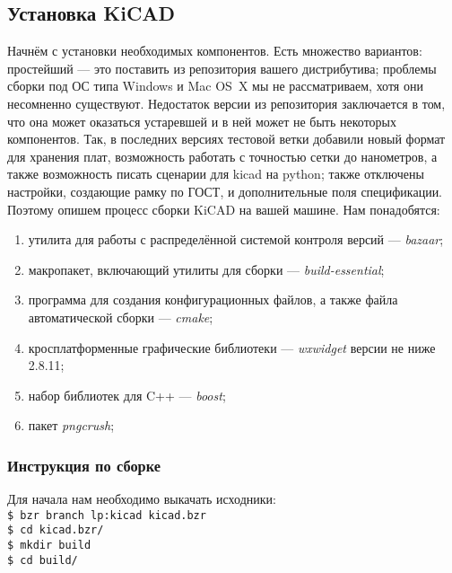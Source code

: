 \subsection{Установка KiCAD} 
Начнём с установки необходимых компонентов. Есть множество вариантов: простейший --- это поставить из репозитория вашего дистрибутива; проблемы сборки под ОС типа Windows и Mac OS~X  мы не рассматриваем, хотя они несомненно существуют. Недостаток версии из репозитория заключается в том, что она может оказаться устаревшей и в ней может не быть некоторых компонентов.
Так, в последних версиях тестовой ветки добавили новый формат для хранения плат, возможность работать с точностью сетки до нанометров, а также возможность писать сценарии для kicad на python; также отключены настройки, создающие рамку по ГОСТ, и дополнительные поля спецификации.
Поэтому опишем процесс сборки KiCAD на вашей машине. Нам понадобятся:
\begin{enumerate}
 \item утилита для работы с распределённой системой контроля версий --- \emph{bazaar};
 \item макропакет, включающий утилиты для сборки --- \emph{build-essential};
 \item программа для создания конфигурационных файлов, а также файла автоматической сборки --- \emph{cmake};
 \item кросплатформенные графические библиотеки --- \emph{wxwidget} версии не ниже 2.8.11;
 \item набор библиотек для C++ --- \emph{boost};
 \item пакет \emph{pngcrush};
\end{enumerate}

\subsubsection{Инструкция по сборке}
Для начала нам необходимо выкачать исходники:\\
\texttt{\$ bzr branch lp:kicad kicad.bzr}\\
\texttt{\$ cd kicad.bzr/}\\
\texttt{\$ mkdir build}\\
\texttt{\$ cd build/}\\

